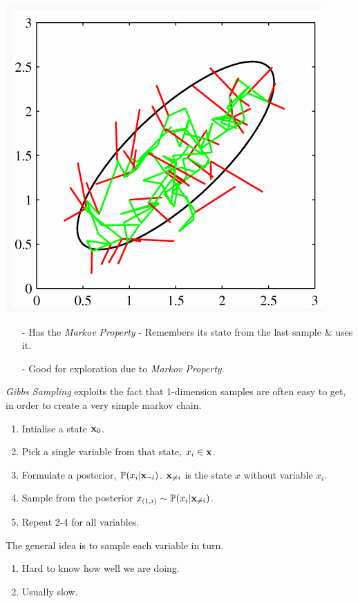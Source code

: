 \documentclass[11pt,a4paper]{article}
\begin{document}
\includegraphics[scale=.4]{img/mcmc.png}

\begin{itemize}
	\item[-] Has the \textit{Markov Property} - Remembers its state from the last sample \& uses it.
	\item[-] Good for exploration due to \textit{Markov Property}.
\end{itemize}

\textit{Gibbs Sampling} exploits the fact that 1-dimension samples are often easy to get, in order to create a very simple markov chain.\\
\begin{enumerate}
	\item Intialise a state $\textbf{x}_0$.
	\item Pick a single variable from that state, $x_i\in\textbf{x}$.
	\item Formulate a posterior, $\mathbb{P}(x_i|\textbf{x}_{\neg i})$. $\textbf{x}_{\neq i}$ is the state $x$ without variable $x_i$.
	\item Sample from the posterior
	$x_{(1,i)}\sim\mathbb{P}(x_i|\textbf{x}_{\neq i})$.
	\item Repeat 2-4 for all variables.
\end{enumerate}
\nb The general idea is to sample each variable in turn.

\begin{enumerate}
	\item Hard to know how well we are doing.
	\item Usually slow.
\end{enumerate}
\end{document}
